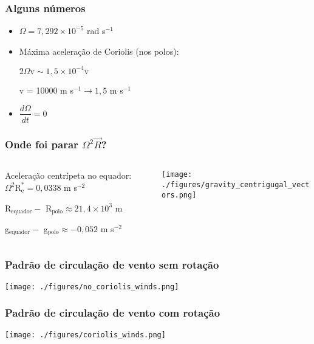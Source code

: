 \begin{frame}
  \frametitle{Alguns números}
  \begin{itemize}[<+-| alert@+>]
    \item $\Omega = 7,292 \times 10^{-5}$ rad s$^{-1}$
    \item Máxima aceleração de Coriolis (nos polos):

        $2\Omega \text{v} \sim 1,5 \times 10^{-4}\text{v}$

        v = 10000 m s$^{-1}  \rightarrow 1,5$ m s$^{-1}$
    \item $\dfrac{d\Omega}{dt} = 0$
  \end{itemize}
\end{frame}


\begin{frame}
  \frametitle{Onde foi parar $\Omega^2\vec{R}$?}

  \begin{columns}
    \begin{column}{0.5\textwidth}
    \small{
      Aceleração centrípeta no equador:
      $\Omega^2\text{R}_{\text{e}}^{*} = 0,0338$ m s$^{-2}$

      R$_{\text{equador}} -$ R$_{\text{polo}} \approx 21,4 \times 10^{3}$ m

      g$_{\text{equador}} -$ g$_{\text{polo}} \approx -0,052$ m s$^{-2}$
      }
    \end{column}
    \begin{column}{0.5\textwidth}
      \begin{center}
        \texttt{[image: ./figures/gravity\_centrigugal\_vectors.png]}
      \end{center}
    \end{column}
  \end{columns}
\end{frame}

\begin{frame}
  \frametitle{Padrão de circulação de vento {\bf sem} rotação}
  \begin{center}
    \texttt{[image: ./figures/no\_coriolis\_winds.png]}
  \end{center}
\end{frame}


\begin{frame}
  \frametitle{Padrão de circulação de vento {\bf com} rotação}
  \begin{center}
    \texttt{[image: ./figures/coriolis\_winds.png]}
  \end{center}
\end{frame}


